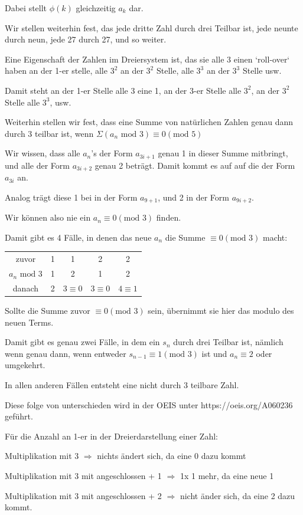 \documentclass[11pt]{article}
\begin{document}
    Dabei stellt $\phi(k)$ gleichzeitig $a_k$ dar.

    \bigskip

    Wir stellen weiterhin fest, das jede dritte Zahl durch drei Teilbar ist, jede neunte durch neun,
    jede 27 durch 27, und so weiter.

    \bigskip

    Eine Eigenschaft der Zahlen im Dreiersystem ist, das sie alle 3 einen `roll-over` haben an der
    1-er stelle, alle $3^2$ an der $3^2$ Stelle, alle $3^3$ an der $3^3$ Stelle usw.

    Damit steht an der 1-er Stelle alle 3 eine 1, an der 3-er Stelle alle $3^2$, an der $3^2$ Stelle
    alle $3^3$, usw.

    \bigskip

    Weiterhin stellen wir fest, dass eine Summe von natürlichen Zahlen genau dann durch 3 teilbar ist,
    wenn $\Sigma(a_n\text{ mod }3) \equiv 0 (\text{mod }5)$

    Wir wissen, dass alle $a_n$'s der Form $a_{3i+1}$ genau 1 in dieser Summe mitbringt,
    und alle der Form $a_{3i+2}$ genau 2 beträgt.
    Damit kommt es auf auf die der Form $a_{3i}$ an.

    Analog trägt diese 1 bei in der Form $a_{9+1}$, und 2 in der Form $a_{9i+2}$.

    Wir können also nie ein $a_n \equiv 0 (\text{mod }3)$ finden.

    Damit gibt es 4 Fälle, in denen das neue $a_n$ die Summe $\equiv 0 (\text{mod }3)$ macht:

    \begin{tabular}{c c c c c}
        zuvor & 1 & 1 & 2 & 2 \\
        $a_n \text{ mod } 3$ & 1 & 2 & 1 & 2 \\
        danach & 2 & $3 \equiv 0$ & $3 \equiv 0$ & $4 \equiv 1$
    \end{tabular}

    \bigskip

    Sollte die Summe zuvor $\equiv 0 (\text{mod } 3)$ sein, übernimmt sie hier das modulo des neuen Terms.

    Damit gibt es genau zwei Fälle, in dem ein $s_n$ durch drei Teilbar ist, nämlich wenn
    genau dann, wenn entweder $s_{n-1} \equiv 1 (\text{mod } 3)$ ist und $a_n \equiv 2$ oder umgekehrt.

    In allen anderen Fällen entsteht eine nicht durch 3 teilbare Zahl.

    Diese folge von unterschieden wird in der OEIS unter https://oeis.org/A060236 geführt.

    \bigskip

    Für die Anzahl an 1-er in der Dreierdarstellung einer Zahl:

    Multiplikation mit 3 $\Rightarrow$ nichts ändert sich, da eine 0 dazu kommt

    Multiplikation mit 3 mit angeschlossen + 1 $\Rightarrow$ 1x 1 mehr, da eine neue 1

    Multiplikation mit 3 mit angeschlossen + 2 $\Rightarrow$ nicht änder sich, da eine 2 dazu kommt.
\end{document}
